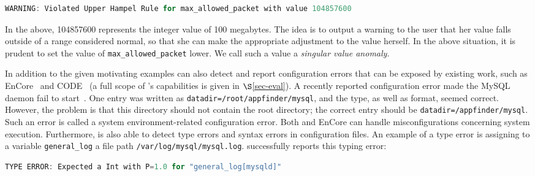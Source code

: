 \begin{lstlisting}[language=C, xleftmargin=.01\textwidth]
WARNING: Violated Upper Hampel Rule for max_allowed_packet with value 104857600 
\end{lstlisting} 

In the above, 104857600 represents the integer value of 100 megabytes. The idea is to output
a warning to the user that her value falls outside of a range considered normal, so that she
can make the appropriate adjustment to the value herself. In the above situation, it is 
prudent to set the value of {\tt max\_allowed\_packet} lower. We call such a value a 
\emph{singular value anomaly}.

In addition to the given motivating examples \app can also detect and report configuration errors that can be exposed by
existing work, such as EnCore~\cite{zhang14encore} and
CODE~\cite{yuan11context} (a full scope of \app's capabilities is given in $\S$\ref{sec-eval}).
A recently reported configuration error made the MySQL
daemon fail to start~\cite{syserror}.
One entry was written as 
{\tt datadir=/root/appfinder/mysql}, and the type, as well as 
format, seemed correct.
However, the problem is that this directory should not 
contain the root directory; the correct entry
should be {\tt datadir=/appfinder/mysql}.
Such an error is called a system environment-related configuration error.
Both \app and EnCore can handle misconfigurations concerning system execution.
Furthermore, \app is also able to detect type errors and syntax errors
in configuration files. An example of a type error is assigning to a variable {\tt {general\_log}} 
a file path {\tt {/var/log/mysql/mysql.log}}. \app successfully reports this typing error: 
\begin{lstlisting}[language=C, xleftmargin=.01\textwidth]
TYPE ERROR: Expected a Int with P=1.0 for "general_log[mysqld]"
\end{lstlisting}
